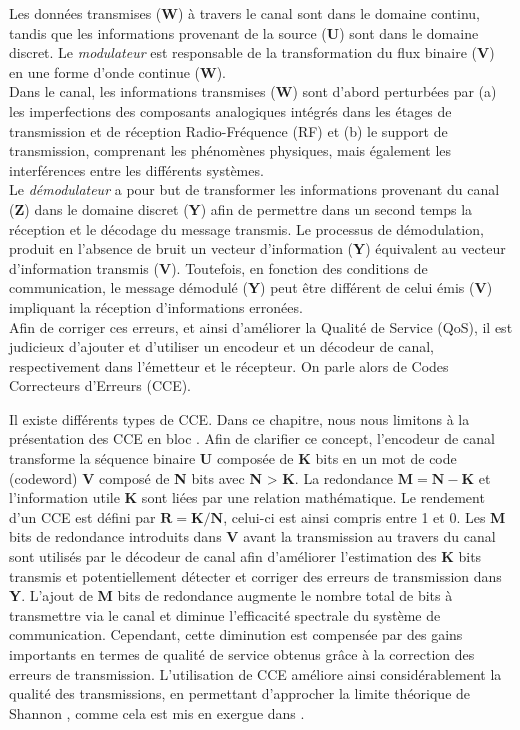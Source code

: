 \documentclass[../main.tex]{subfiles}
\begin{document}
Les données transmises (\textbf{W}) à travers le canal sont dans le domaine continu, tandis que les informations provenant de la source (\textbf{U}) sont dans le domaine discret.
Le \textit{modulateur} est responsable de la transformation du flux binaire (\textbf{V}) en une forme d’onde continue (\textbf{W}). \\
Dans le canal, les informations transmises (\textbf{W}) sont d'abord perturbées par (a) les imperfections des composants analogiques intégrés dans les étages de transmission et de réception Radio-Fréquence (RF) et (b) le support de transmission, comprenant les phénomènes physiques, mais également les interférences entre les différents systèmes.\\
Le \textit{démodulateur} a pour but de transformer les informations provenant du canal (\textbf{Z}) dans le domaine discret (\textbf{Y}) afin de permettre dans un second temps la réception et le décodage du message transmis. 
Le processus de démodulation, produit en l’absence de bruit un vecteur d’information (\textbf{Y}) équivalent au vecteur d’information transmis (\textbf{V}). Toutefois, en fonction des conditions de communication, le message démodulé (\textbf{Y}) peut être différent de celui émis (\textbf{V}) impliquant la réception d’informations erronées. \\
Afin de corriger ces erreurs, et ainsi d'améliorer la Qualité de Service (QoS), il est judicieux d'ajouter et d'utiliser un encodeur et un décodeur de canal, respectivement dans l'émetteur et le récepteur. On parle alors de Codes Correcteurs d'Erreurs (CCE).


Il existe différents types de CCE. Dans ce chapitre, nous nous limitons à la présentation des CCE en bloc  \cite{BookCodes}. Afin de clarifier ce concept, l'encodeur de canal transforme la séquence binaire \textbf{U} composée de \textbf{K} bits en un mot de code (codeword) \textbf{V} composé de \textbf{N} bits avec \textbf{N} > \textbf{K}. La redondance $\bm{M=N-K}$ et l'information utile \textbf{K} sont liées par une relation mathématique. Le rendement d'un CCE est défini par $\bm{R=K/N}$, celui-ci est ainsi compris entre 1 et 0. Les \textbf{M} bits de redondance introduits dans \textbf{V} avant la transmission au travers du canal sont utilisés par le décodeur de canal afin d’améliorer l’estimation des \textbf{K} bits transmis et potentiellement détecter et corriger des erreurs de transmission dans \textbf{Y}. L’ajout de \textbf{M} bits de redondance augmente le nombre total de bits à transmettre via le canal et diminue l’efficacité spectrale du système de communication. Cependant, cette diminution est compensée par des gains importants en termes de qualité de service obtenus grâce à la correction des erreurs de transmission. L'utilisation de CCE améliore ainsi considérablement la qualité des transmissions, en permettant d’approcher la limite théorique de Shannon \cite{Sha48}, comme cela est mis en exergue dans \cite{NearShanon}.
\end{document}
